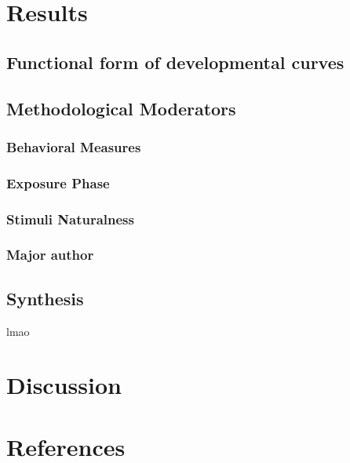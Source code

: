 \documentclass[10pt, letterpaper]{article}
\begin{document}
\hypertarget{results}{%
\section{Results}\label{results}}

\hypertarget{functional-form-of-developmental-curves}{%
\subsection{Functional form of developmental
curves}\label{functional-form-of-developmental-curves}}

\hypertarget{methodological-moderators}{%
\subsection{Methodological Moderators}\label{methodological-moderators}}

\hypertarget{behavioral-measures}{%
\subsubsection{Behavioral Measures}\label{behavioral-measures}}

\hypertarget{exposure-phase}{%
\subsubsection{Exposure Phase}\label{exposure-phase}}

\hypertarget{stimuli-naturalness}{%
\subsubsection{Stimuli Naturalness}\label{stimuli-naturalness}}

\hypertarget{major-author}{%
\subsubsection{Major author}\label{major-author}}

\hypertarget{synthesis}{%
\subsection{Synthesis}\label{synthesis}}

lmao

\hypertarget{discussion}{%
\section{Discussion}\label{discussion}}

\hypertarget{references}{%
\section{References}\label{references}}

\setlength{\parindent}{-0.1in} 
\setlength{\leftskip}{0.125in}

\noindent


\end{document}
